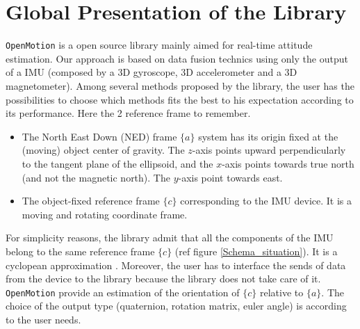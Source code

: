 
\section{Global Presentation of the Library}

\texttt{OpenMotion} is a open source library mainly aimed for real-time attitude estimation. Our approach is based on data fusion technics using only the output of a IMU (composed by a 3D gyroscope,  3D accelerometer and a 3D magnetometer). Among several methods proposed by the library, the user has the possibilities to choose which methods fits the best to his expectation according to its performance. Here the 2 reference frame to remember.


\vspace{0.1cm}

\begin{itemize}
\item The North East Down (NED) frame $\{a\}$ system has its origin fixed at the (moving) object center of gravity. The $z$-axis points upward perpendicularly to the tangent plane of the ellipsoid, and the $x$-axis points towards true north (and not the magnetic north). The $y$-axis point towards east.

\vspace{0.1cm}

\item The object-fixed reference frame $\{c\}$ corresponding to the IMU device. It is a moving and rotating coordinate frame. 
\end{itemize}

\vspace{0.1cm}

For simplicity reasons, the library admit that all the components of the IMU belong to the same reference frame $\{c\}$ (ref figure \ref{Schema_situation}). It is a cyclopean approximation \cite{ouarti2008multimodal}. Moreover, the user has to interface the sends of data from the device to the library because the library does not take care of it. \texttt{OpenMotion} provide an estimation of the orientation of $\{c\}$ relative to $\{a\}$. The choice of the output type (quaternion, rotation matrix, euler angle) is according to the user needs. 

